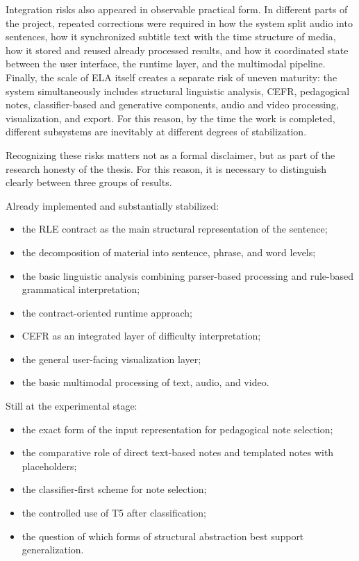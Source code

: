\documentclass[12pt,a4paper,oneside]{report}
\begin{document}
Integration risks also appeared in observable practical form. In different parts of the project, repeated corrections were required in how the system split audio into sentences, how it synchronized subtitle text with the time structure of media, how it stored and reused already processed results, and how it coordinated state between the user interface, the runtime layer, and the multimodal pipeline. Finally, the scale of ELA itself creates a separate risk of uneven maturity: the system simultaneously includes structural linguistic analysis, CEFR, pedagogical notes, classifier-based and generative components, audio and video processing, visualization, and export. For this reason, by the time the work is completed, different subsystems are inevitably at different degrees of stabilization.

Recognizing these risks matters not as a formal disclaimer, but as part of the research honesty of the thesis. For this reason, it is necessary to distinguish clearly between three groups of results.

Already implemented and substantially stabilized:
\begin{itemize}
  \item the RLE contract as the main structural representation of the sentence;
  \item the decomposition of material into sentence, phrase, and word levels;
  \item the basic linguistic analysis combining parser-based processing and rule-based grammatical interpretation;
  \item the contract-oriented runtime approach;
  \item CEFR as an integrated layer of difficulty interpretation;
  \item the general user-facing visualization layer;
  \item the basic multimodal processing of text, audio, and video.
\end{itemize}

Still at the experimental stage:
\begin{itemize}
  \item the exact form of the input representation for pedagogical note selection;
  \item the comparative role of direct text-based notes and templated notes with placeholders;
  \item the classifier-first scheme for note selection;
  \item the controlled use of T5 after classification;
  \item the question of which forms of structural abstraction best support generalization.
\end{itemize}
\end{document}
